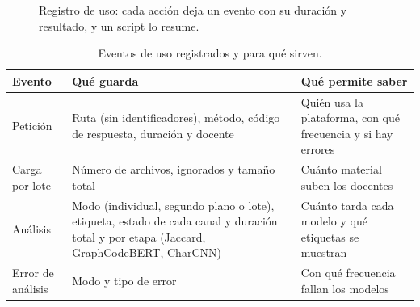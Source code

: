 \begin{figure}[H]
    \centering
    \caption{Registro de uso: cada acción deja un evento con su duración y resultado, y un script lo resume.}
    \label{fig:eventos}
\end{figure}

\begin{table}[H]
    \centering
    \caption{Eventos de uso registrados y para qué sirven.}
    \label{tab:eventos}
    \renewcommand{\arraystretch}{1.25}
    \small
    \begin{tabularx}{\textwidth}{|>{\raggedright\arraybackslash}p{3.0cm}|>{\raggedright\arraybackslash}X|>{\raggedright\arraybackslash}X|}
        \hline
        \textbf{Evento} & \textbf{Qué guarda} & \textbf{Qué permite saber} \\ \hline
        Petición & Ruta (sin identificadores), método, código de respuesta, duración y docente & Quién usa la plataforma, con qué frecuencia y si hay errores \\ \hline
        Carga por lote & Número de archivos, ignorados y tamaño total & Cuánto material suben los docentes \\ \hline
        Análisis & Modo (individual, segundo plano o lote), etiqueta, estado de cada canal y duración total y por etapa (Jaccard, GraphCodeBERT, CharCNN) & Cuánto tarda cada modelo y qué etiquetas se muestran \\ \hline
        Error de análisis & Modo y tipo de error & Con qué frecuencia fallan los modelos \\ \hline
    \end{tabularx}
\end{table}

